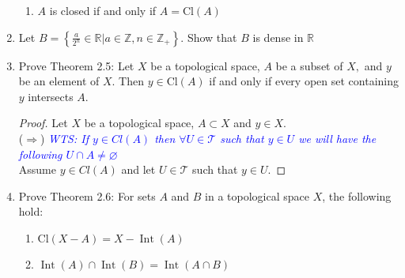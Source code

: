 \documentclass[12pt]{article}
\newcommand{\TT}{\mathcal{T}}
\newcommand{\wts}[1]{\textit{\textcolor{blue}{WTS: #1}}\\}
\newcommand{\pp}{\textit{\textcolor{yellow}{PP: }}}%
\begin{document}
\begin{enumerate}
\begin{enumerate}
		\item[(c)] $A$ is closed if and only if $A = \mathrm { Cl } ( A )$\\
		
	\end{enumerate}
	\item[\pp2.07] Let $B=\left\{\frac{a}{2^{n}} \in \mathbb{R} | a \in \mathbb{Z}, n \in \mathbb{Z}_{+}\right\} .$ Show that $B$ is dense in $\mathbb{R}$
	
	\item[2.10] Prove Theorem 2.5: Let $X$ be a topological space, $A$ be a subset of $X,$ and $y$ be an element of $X .$ Then $y \in \mathrm{Cl}(A)$ if and only if every open set containing $y$ intersects $A$.
	\begin{proof}
		Let $ X $ be a topological space, $ A\subset X $ and $ y\in X $.\\
		($ \Rightarrow $) \wts{If $ y\in Cl(A) $ then $ \forall U \in \TT $ such that $ y\in U $ we will have the following $ U\cap A \not= \varnothing $}
		Assume $ y\in Cl(A) $ and let $ U\in \TT $ such that $ y\in U $. 
	\end{proof}
	
	\item[\pp2.11] Prove Theorem 2.6: For sets $ A $ and $ B $ in a topological space $ X $, the following hold:
	\begin{enumerate}
		\item[(a)] $\mathrm { Cl } ( X - A ) = X - \operatorname { Int } ( A )$\\
		\item[(b)] $\operatorname { Int } ( A ) \cap \operatorname { Int } ( B ) = \operatorname { Int } ( A \cap B )$\\
	\end{enumerate}
	
	
	

\end{enumerate}
\end{document}
